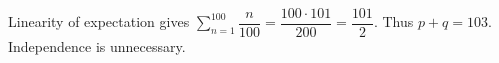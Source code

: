 Linearity of expectation gives $\sum_{n=1}^{100}\dfrac{n}{100}=\dfrac{100\cdot101}{200}=\dfrac{101}{2}$. Thus $p+q=\boxed{103}$. Independence is unnecessary.
